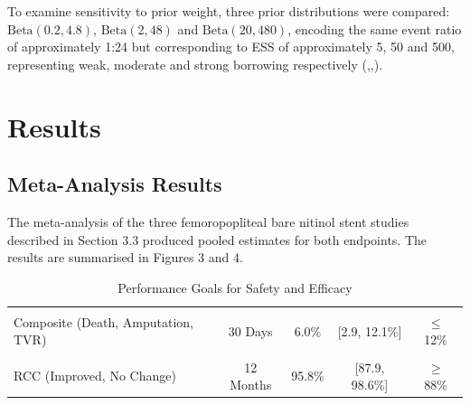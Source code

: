 \documentclass{article}
\begin{document}
To examine sensitivity to prior weight, three prior distributions were
compared: \(\text{Beta}(0.2, 4.8)\), \(\text{Beta}(2, 48)\) and
\(\text{Beta}(20, 480)\), encoding the same event ratio of approximately
1:24 but corresponding to ESS of approximately 5, 50 and 500,
representing weak, moderate and strong borrowing respectively
(,,).

\newpage

\section{Results}\label{results}

\subsection{Meta-Analysis Results}\label{meta-analysis-results}

The meta-analysis of the three femoropopliteal bare nitinol stent
studies described in Section 3.3 produced pooled estimates for both
endpoints. The results are summarised in Figures 3 and 4.

\begin{table}[H]
\centering
\caption{\label{tab:performance-goals-table}Performance Goals for Safety and Efficacy}
\centering
\fontsize{11}{13}\selectfont
\begin{tabular}[t]{>{\raggedright\arraybackslash}p{5.2cm}cccc}
\toprule
\cellcolor[HTML]{3A3A6A}{\textcolor{white}{Endpoint}} & \cellcolor[HTML]{3A3A6A}{\textcolor{white}{Timepoint}} & \cellcolor[HTML]{3A3A6A}{\textcolor{white}{Pooled Proportion}} & \cellcolor[HTML]{3A3A6A}{\textcolor{white}{95\% CI}} & \cellcolor[HTML]{3A3A6A}{\textcolor{white}{Performance Goal}}\\
\midrule
\addlinespace[0.3em]
\multicolumn{5}{l}{\cellcolor[HTML]{4A4A6A}{\textcolor{white}{Safety Endpoints}}}\\
\hspace{1em}Composite (Death, Amputation, TVR) & 30 Days & 6.0\% & {}[2.9, 12.1\%] & $\leq$ 12\%\\
\addlinespace[0.3em]
\multicolumn{5}{l}{\cellcolor[HTML]{6B4A2A}{\textcolor{white}{Efficacy Endpoints}}}\\
\hspace{1em}RCC (Improved, No Change) & 12 Months & 95.8\% & {}[87.9, 98.6\%] & $\geq$ 88\%\\
\bottomrule
\end{tabular}
\end{table}
\end{document}
